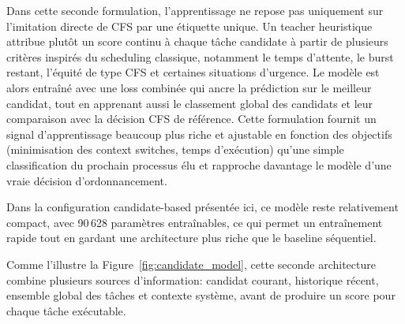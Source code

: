 \documentclass[letterpaper, 10 pt, conference]{ieeeconf}  %
\begin{document}
Dans cette seconde formulation, l'apprentissage ne repose pas uniquement sur l'imitation directe de CFS par une étiquette unique. Un teacher heuristique attribue plutôt un score continu à chaque tâche candidate à partir de plusieurs critères inspirés du scheduling classique, notamment le temps d'attente, le burst restant, l'équité de type CFS et certaines situations d'urgence. Le modèle est alors entraîné avec une loss combinée qui ancre la prédiction sur le meilleur candidat, tout en apprenant aussi le classement global des candidats et leur comparaison avec la décision CFS de référence. Cette formulation fournit un signal d'apprentissage beaucoup plus riche et ajustable en fonction des objectifs (minimisation des context switches, temps d'exécution) qu'une simple classification du prochain processus élu et rapproche davantage le modèle d'une vraie décision d'ordonnancement.

Dans la configuration candidate-based présentée ici, ce modèle reste relativement compact, avec 90\,628 paramètres entraînables, ce qui permet un entraînement rapide tout en gardant une architecture plus riche que le baseline séquentiel.

Comme l'illustre la Figure~\ref{fig:candidate_model}, cette seconde architecture combine plusieurs sources d'information: candidat courant, historique récent, ensemble global des tâches et contexte système, avant de produire un score pour chaque tâche exécutable.
\end{document}
